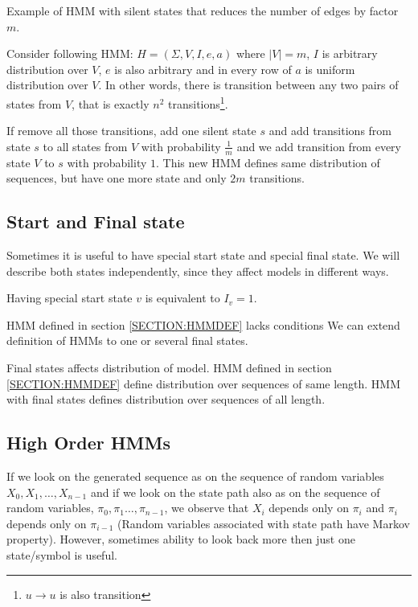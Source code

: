 \begin{example}
Example of HMM with silent states that reduces the number of edges by factor
$m$.

Consider following HMM: $H=(\Sigma,V,I,e,a)$ where
$|V|=m$, $I$ is arbitrary distribution over $V$, $e$ is also arbitrary and in
every row of $a$ is uniform distribution over $V$. In other words, there is
transition between any two pairs of states from $V$, that is exactly $n^2$
transitions\footnote{$u\to u$ is also transition}.

If remove all those transitions, add one silent state $s$ and add transitions
from state $s$ to all states from $V$ with probability $\frac1m$  and we add
transition from every state $V$ to $s$ with probability $1$. This new HMM
defines same distribution of sequences, but have one more state and only $2m$
transitions. 
\end{example}



\subsection{Start and Final state}

Sometimes it is useful to have special start state and special final state. We
will describe both states independently, since they affect models in different
ways. 

Having special start state $v$ is equivalent to $I_v=1$. 

HMM defined in section \ref{SECTION:HMMDEF} lacks conditions 
We can extend definition of HMMs to one or several final states.  


Final states affects distribution of model. HMM defined in section
\ref{SECTION:HMMDEF} define distribution over sequences of same length. HMM with
final states defines distribution over sequences of all length. 

\subsection{High Order HMMs}

If we look on the generated sequence as on the sequence of random variables
$X_0,X_1,\dots, X_{n-1}$ and if we look on the state path also as on the
sequence of random variables, $\pi_0,\pi_1\dots,\pi_{n-1}$, we observe that
$X_i$ depends only on $\pi_i$ and $\pi_i$ depends only on $\pi_{i-1}$ (Random
variables associated with state path have Markov property\cite{}). However,
sometimes ability to look back more then just one state/symbol is useful.

